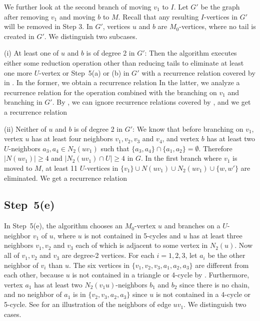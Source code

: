 \documentclass{elsart_TR2}
\begin{document}
We further look at the second branch of moving $v_1$ to $I$.
Let $G'$ be the graph after removing $v_1$ and moving $b$ to $M$.
Recall that any resulting $I$-vertices in $G'$  will be removed in Step 3.
In $G'$, vertices $u$ and $b$ are  $M_0$-vertices, where no tail is created in $G'$.
We distinguish two subcases.

(i) At least one of $u$ and $b$ is of degree 2 in $G'$:
Then the algorithm executes either
 some reduction operation other than reducing tails
to eliminate at least one more $U$-vertex
or   Step~5(a) or  (b) in $G'$
with a recurrence relation covered by  in .
In the former, we obtain a recurrence relation
In the latter, we analyze a recurrence relation for the operation combined with
the branching on $v_1$ and branching in $G'$.
By ,
we can ignore recurrence relations covered by ,
and   we get a recurrence relation



(ii) Neither of $u$ and $b$ is of degree 2 in $G'$:
We know that before branching on $v_1$,
vertex $u$ has at least four neighbors $v_1,v_2,v_3$ and $v_4$,
and vertex $b$ has at least two $U$-neighbors $a_3,a_4\in N_2(uv_1)$ such that $\{a_3,a_4\}\cap\{ a_1,a_2\}=\emptyset$.
 Therefore $|N(uv_1)|\geq 4$ and $|N_2(uv_1)\cap U|\geq 4$ in $G$.
In the first branch where $v_1$ is moved to $M$,
at least 11 $U$-vertices in $\{v_1\}\cup N(uv_1) \cup N_2(uv_1)\cup \{w,w'\}$ are eliminated.
We get a recurrence relation



\subsection{Step~5(e)}

In Step~5(e), the algorithm chooses
an  $M_0$-vertex $u$ and branches on a $U$-neighbor  $v_1$ of $u$,
where  $u$ is not contained in 5-cycles and $u$ has at least three neighbors $v_1, v_2$ and $v_3$
each of which is adjacent  to some vertex in $N_2(u)$.
Now all of $v_1,v_2$ and $v_3$ are degree-2 vertices.
For each $i=1,2,3$, let $a_i$ be the other neighbor of $v_i$ than $u$.
The six vertices in $\{v_1,v_2,v_3,a_1,a_2,a_3\}$ are different from each other,
because $u$ is not contained in a triangle or 4-cycle by .
Furthermore, vertex $a_1$ has at least two $N_2(v_1u)$-neighbors $b_1$ and $b_2$ since there is no chain, and
no neighbor of $a_1$ is in $\{v_2,v_3,a_2,a_3\}$ since $u$ is not contained in a 4-cycle or 5-cycle.
See  for an illustration of the neighbors of edge $uv_1$.
We distinguish two cases.
\end{document}
